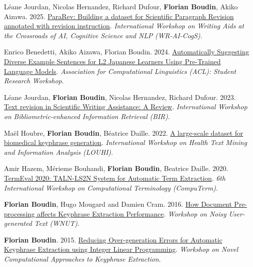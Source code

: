 \item
Léane Jourdan, Nicolas Hernandez, Richard Dufour, \textbf{Florian Boudin}, Akiko Aizawa.
2025.
\href{https://arxiv.org/abs/2501.05222}{ParaRev: Building a dataset for Scientific Paragraph Revision annotated with revision instruction}.
\textit{International Workshop on Writing Aids at the Crossroads of AI, Cognitive Science and NLP (WR-AI-CogS)}.
\label{jourdan-etal-2025-pararev}

\item 
Enrico Benedetti, Akiko Aizawa, Florian Boudin.
2024.
\href{https://aclanthology.org/2024.acl-srw.11.pdf}{Automatically Suggesting Diverse Example Sentences for L2 Japanese Learners Using Pre-Trained Language Models}.
\textit{Association for Computational Linguistics (ACL): Student Research Workshop}.
\label{benedetti-etal-2024-automatically}

\item 
Léane Jourdan, \textbf{Florian Boudin}, Nicolas Hernandez, Richard Dufour.
2023.
\href{https://ceur-ws.org/Vol-3617/paper-04.pdf}{Text revision in Scientific Writing Assistance: A Review}.
\textit{International Workshop on Bibliometric-enhanced Information Retrieval (BIR)}.
\label{jourdan-etal-2023-text}

\item 
Maël Houbre, \textbf{Florian Boudin}, Béatrice Daille.
2022.
\href{https://aclanthology.org/2022.louhi-1.6.pdf}{A large-scale dataset for biomedical keyphrase generation}.
\textit{International Workshop on Health Text Mining and Information Analysis (LOUHI)}.
\label{houbre-etal-2022-large}

\item 
Amir Hazem, Mérieme Bouhandi, \textbf{Florian Boudin}, Beatrice Daille.
2020.
\href{https://aclanthology.org/2020.computerm-1.13.pdf}{TermEval 2020: TALN-LS2N System for Automatic Term Extraction}.
\textit{6th International Workshop on Computational Terminology (CompuTerm)}.
\label{hazem-etal-2020-termeval}

\item 
\textbf{Florian Boudin}, Hugo Mougard and Damien Cram.
2016.
\href{https://aclanthology.org/W16-3917.pdf}{How Document Pre-processing affects Keyphrase Extraction Performance}.
\textit{Workshop on Noisy User-generated Text (WNUT)}.
\label{boudin-etal-2016-document}

\item 
\textbf{Florian Boudin}.
2015.
\href{https://aclanthology.org/W15-3605.pdf}{Reducing Over-generation Errors for Automatic Keyphrase Extraction using Integer Linear Programming}.
\textit{Workshop on Novel Computational Approaches to Keyphrase Extraction}.
\label{boudin-2015-reducing}

